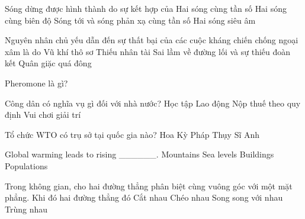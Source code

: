 \begin{ex}
    Sóng dừng được hình thành do sự kết hợp của
    \choice
    {Hai sóng cùng tần số}
    {Hai sóng cùng biên độ}
    {\True Sóng tới và sóng phản xạ cùng tần số}
    {Hai sóng siêu âm}

\end{ex}
\begin{ex}
    Nguyên nhân chủ yếu dẫn đến sự thất bại của các cuộc kháng chiến chống ngoại xâm là do
    \choice
    {Vũ khí thô sơ}
    {Thiếu nhân tài}
    {\True Sai lầm về đường lối và sự thiếu đoàn kết}
    {Quân giặc quá đông}

\end{ex}
\begin{ex}
    Pheromone là gì?
\end{ex}
\begin{ex}
    Công dân có nghĩa vụ gì đối với nhà nước?
    \choice
    {Học tập}
    {Lao động}
    {\True Nộp thuế theo quy định}
    {Vui chơi giải trí}

\end{ex}
\begin{ex}
    Tổ chức WTO có trụ sở tại quốc gia nào?
    \choice
    {Hoa Kỳ}
    {Pháp}
    {\True Thụy Sĩ}
    {Anh}

\end{ex}
\begin{ex}
    Global warming leads to rising ______.
    \choice
    {Mountains}
    {\True Sea levels}
    {Buildings}
    {Populations}

\end{ex}
\begin{ex}
    Trong không gian, cho hai đường thẳng phân biệt cùng vuông góc với một mặt phẳng. Khi đó hai đường thẳng đó
    \choice
    {Cắt nhau}
    {Chéo nhau}
    {\True Song song với nhau}
    {Trùng nhau}

\end{ex}
